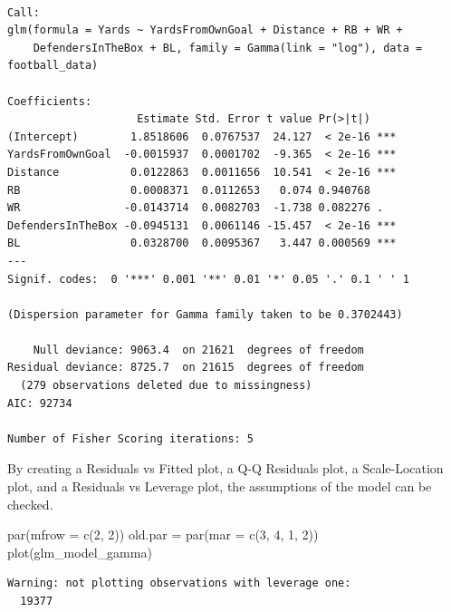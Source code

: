 \documentclass[
  super,
  preprint,
  3p]{elsarticle}
\newenvironment{Shaded}{\begin{snugshade}}{\end{snugshade}}
\newcommand{\AttributeTok}[1]{\textcolor[rgb]{0.40,0.45,0.13}{#1}}
\newcommand{\DecValTok}[1]{\textcolor[rgb]{0.68,0.00,0.00}{#1}}
\newcommand{\FunctionTok}[1]{\textcolor[rgb]{0.28,0.35,0.67}{#1}}
\newcommand{\NormalTok}[1]{\textcolor[rgb]{0.00,0.23,0.31}{#1}}
\newcommand{\OtherTok}[1]{\textcolor[rgb]{0.00,0.23,0.31}{#1}}
\begin{document}
\begin{verbatim}

Call:
glm(formula = Yards ~ YardsFromOwnGoal + Distance + RB + WR + 
    DefendersInTheBox + BL, family = Gamma(link = "log"), data = football_data)

Coefficients:
                    Estimate Std. Error t value Pr(>|t|)    
(Intercept)        1.8518606  0.0767537  24.127  < 2e-16 ***
YardsFromOwnGoal  -0.0015937  0.0001702  -9.365  < 2e-16 ***
Distance           0.0122863  0.0011656  10.541  < 2e-16 ***
RB                 0.0008371  0.0112653   0.074 0.940768    
WR                -0.0143714  0.0082703  -1.738 0.082276 .  
DefendersInTheBox -0.0945131  0.0061146 -15.457  < 2e-16 ***
BL                 0.0328700  0.0095367   3.447 0.000569 ***
---
Signif. codes:  0 '***' 0.001 '**' 0.01 '*' 0.05 '.' 0.1 ' ' 1

(Dispersion parameter for Gamma family taken to be 0.3702443)

    Null deviance: 9063.4  on 21621  degrees of freedom
Residual deviance: 8725.7  on 21615  degrees of freedom
  (279 observations deleted due to missingness)
AIC: 92734

Number of Fisher Scoring iterations: 5
\end{verbatim}

By creating a Residuals vs Fitted plot, a Q-Q Residuals plot, a
Scale-Location plot, and a Residuals vs Leverage plot, the assumptions
of the model can be checked.

\begin{Shaded}
\begin{Highlighting}[]
\FunctionTok{par}\NormalTok{(}\AttributeTok{mfrow =} \FunctionTok{c}\NormalTok{(}\DecValTok{2}\NormalTok{, }\DecValTok{2}\NormalTok{))}
\NormalTok{old.par }\OtherTok{=} \FunctionTok{par}\NormalTok{(}\AttributeTok{mar =} \FunctionTok{c}\NormalTok{(}\DecValTok{3}\NormalTok{, }\DecValTok{4}\NormalTok{, }\DecValTok{1}\NormalTok{, }\DecValTok{2}\NormalTok{))}
\FunctionTok{plot}\NormalTok{(glm\_model\_gamma)}
\end{Highlighting}
\end{Shaded}

\begin{verbatim}
Warning: not plotting observations with leverage one:
  19377
\end{verbatim}
\end{document}
